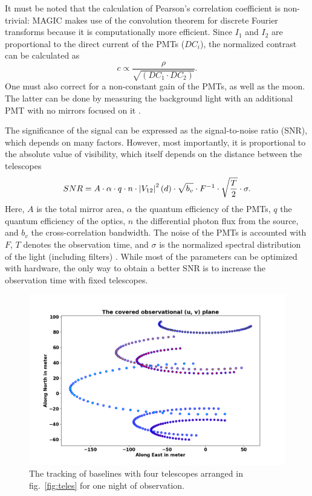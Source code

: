 It must be noted that the calculation of Pearson's correlation coefficient is non-trivial: MAGIC makes use of the convolution theorem for discrete Fourier transforms because it is computationally more efficient. Since $I_1$ and $I_2$ are proportional to the direct current of the PMTs ($DC_i$), the normalized contrast can be calculated as 
\begin{equation}
	c \propto \frac{\rho}{\sqrt{\left(DC_1 \cdot DC_2 \right)}}.
	\label{eq:norm_contrast2}
\end{equation}
One must also correct for a non-constant gain of the PMTs, as well as the moon. The latter can be done by measuring the background light with an additional PMT with no mirrors focused on it \citep{acciari2020optical}.

The significance of the signal can be expressed as the signal-to-noise ratio (SNR), which depends on many factors. However, most importantly, it is proportional to the absolute value of visibility, which itself depends on the distance between the telescopes \citep{acciari2020optical} 
\begin{equation}
	SNR = A \cdot \alpha \cdot q \cdot n \cdot \left|V_{12}\right|^{2}(d) \cdot \sqrt{b_v} \cdot F^{-1} \cdot \sqrt{\frac{T}{2}} \cdot \sigma.
	\label{eq:SNR}
\end{equation}
Here, $A$ is the total mirror area, $\alpha$ the quantum efficiency of the PMTs, $q$ the quantum efficiency of the optics, $n$ the differential photon flux from the source, and $b_v$ the cross-correlation bandwidth. The noise of the PMTs is accounted with $F$, $T$ denotes the observation time, and $\sigma$ is the normalized spectral distribution of the light (including filters) \citep{acciari2020optical}. While most of the parameters can be optimized with hardware, the only way to obtain a better SNR is to increase the observation time with fixed telescopes.  
\begin{figure}
	\centering
	\includegraphics[width=\linewidth]{fig/baseline.png}
	\caption{The tracking of baselines with four telescopes arranged in fig.~\ref{fig:teles} for one night of observation.}
	\label{fig:base}
\end{figure}

